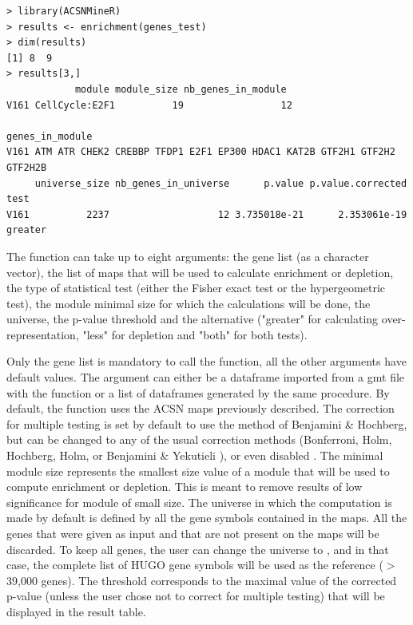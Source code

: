 \documentclass[article]{jss}
\begin{document}
\begin{verbatim}
> library(ACSNMineR)
> results <- enrichment(genes_test)
> dim(results)
[1] 8  9
> results[3,]
            module module_size nb_genes_in_module
V161 CellCycle:E2F1          19                 12
                                                             genes_in_module
V161 ATM ATR CHEK2 CREBBP TFDP1 E2F1 EP300 HDAC1 KAT2B GTF2H1 GTF2H2 GTF2H2B
     universe_size nb_genes_in_universe      p.value p.value.corrected    test
V161          2237                   12 3.735018e-21      2.353061e-19 greater
\end{verbatim}



The  function can take up to eight arguments: the gene list (as
a character vector), the list of maps that will be used to calculate enrichment
or depletion, the type of statistical test (either the Fisher exact test or the
hypergeometric test), the module minimal size for which the calculations will be
done, the universe, the p-value threshold and the alternative ("greater" for
calculating over-representation, "less" for depletion and "both" for both
tests).

Only the gene list is mandatory to call the  function, all the
other arguments have default values.  The  argument can either be a
dataframe imported from a gmt file with the  function or
a list of dataframes generated by the same procedure. By default, the function
uses the ACSN maps previously described.  The correction for multiple testing
is set by default to use the method of Benjamini \& Hochberg, but can be
changed to any of the usual correction methods (Bonferroni, Holm, Hochberg,
Holm, or Benjamini \& Yekutieli \citep{Benjamini2003FDR}), or even disabled .
The minimal module size represents the smallest size value of a module that
will be used to compute enrichment or depletion. This is meant to remove
results of low significance for module of small size.  The universe in which
the computation is made by default is defined by all the gene symbols contained
in the maps. All the genes that were given as input and that are not present on
the maps will be discarded. To keep all genes, the user can change the universe
to , and in that case, the complete list of HUGO gene symbols will
be used as the reference ($>$ 39,000 genes). The threshold corresponds to the
maximal value of the corrected p-value (unless the user chose not to correct
for multiple testing) that will be displayed in the result table.
\end{document}
